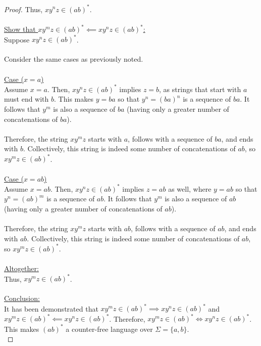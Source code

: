\documentclass[12pt]{article}
\begin{document}
\begin{proof}
    Thus, $xy^nz \in (ab)^*$. \\
    \\
    \underline{Show that $xy^mz \in (ab)^* \impliedby xy^nz \in (ab)^*$:} \\
    Suppose $xy^nz \in (ab)^*$. \\
    \\
    Consider the same cases as previously noted. \\
    \\
    \underline{Case ($x = a$)} \\
    Assume $x = a$. Then, $xy^nz \in (ab)^*$ implies $z = b$, as strings that start with $a$ must end with $b$. This makes $y = ba$ so that $y^n = (ba)^n$ is a sequence of $ba$. It follows that $y^m$ is also a sequence of $ba$ (having only a greater number of concatenations of $ba$). \\
    \\
    Therefore, the string $xy^mz$ starts with $a$, follows with a sequence of $ba$, and ends with $b$. Collectively, this string is indeed some number of concatenations of $ab$, so $xy^mz \in (ab)^*$. \\
    \\
    \underline{Case ($x = ab$)} \\
    Assume $x = ab$. Then, $xy^nz \in (ab)^*$ implies $z = ab$ as well, where $y = ab$ so that $y^n = (ab)^m$ is a sequence of $ab$. It follows that $y^m$ is also a sequence of $ab$ (having only a greater number of concatenations of $ab$). \\
    \\
    Therefore, the string $xy^mz$ starts with $ab$, follows with a sequence of $ab$, and ends with $ab$. Collectively, this string is indeed some number of concatenations of $ab$, so $xy^mz \in (ab)^*$. \\
    \\
    \underline{Altogether:} \\
    Thus, $xy^mz \in (ab)^*$. \\
    \\
    \underline{Conclusion:} \\
    It has been demonstrated that $xy^mz \in (ab)^* \implies xy^nz \in (ab)^*$ and $xy^mz \in (ab)^* \impliedby xy^nz \in (ab)^*$. Therefore, $xy^mz \in (ab)^* \iff xy^nz \in (ab)^*$. This makes $(ab)^*$ a counter-free language over $\Sigma = \{a, b\}$. \\
\end{proof}
\leavevmode\\
\end{document}
